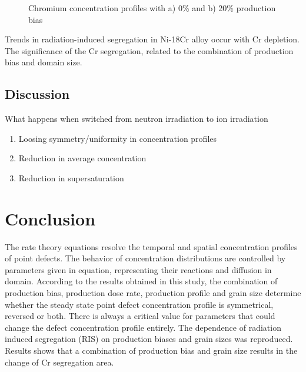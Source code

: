 \documentclass[a4paper]{article}
\begin{document}
    \begin{figure}[h!]  %
        \centering
        \caption{Chromium concentration profiles with a) 0\% and b) 20\% production bias }
        \label{figure:RIS_Cr_concentration}
    \end{figure}


        Trends in radiation-induced segregation in Ni-18Cr alloy occur with Cr depletion. The significance of the Cr segregation, related to the combination of production bias and domain size.\\




\clearpage

  \subsection{Discussion} \hspace{10pt}

  What happens when switched from neutron irradiation to ion irradiation
  \begin{enumerate}
    \item Loosing symmetry/uniformity in concentration profiles
    \item Reduction in average concentration
    \item Reduction in supersaturation
  \end{enumerate}

\section{Conclusion} \hspace{10pt}

The rate theory equations resolve the temporal and spatial concentration profiles of point defects. The behavior of concentration distributions are controlled by parameters given in equation, representing their reactions and diffusion in domain. According to the results obtained in this study, the combination of production bias, production dose rate, production profile and grain size determine whether the steady state point defect concentration profile is symmetrical, reversed or both. There is always a critical value for parameters that could change the defect concentration profile entirely.
The dependence of radiation induced segregation (RIS) on production biases and grain sizes was reproduced. Results shows that a combination of production bias and grain size results in the change of Cr segregation area.



\end{document}
